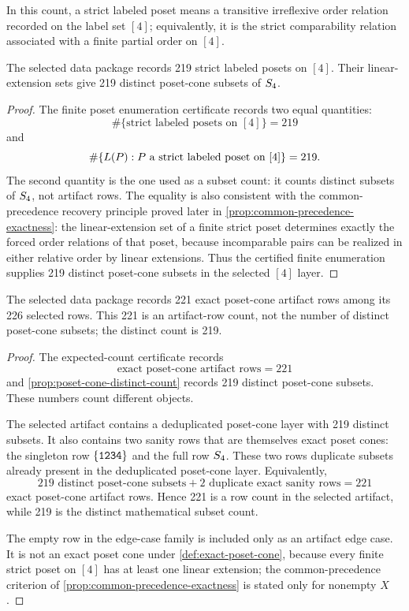 In this count, a strict labeled poset means a transitive irreflexive order relation recorded on the label set \([4]\); equivalently, it is the strict comparability relation associated with a finite partial order on \([4]\).

\begin{certproposition}
\label{prop:poset-cone-distinct-count}
The selected data package records 219 strict labeled posets on \([4]\). Their linear-extension sets give 219 distinct poset-cone subsets of \(S_4\).
\end{certproposition}

\begin{proof}
The finite poset enumeration certificate records two equal quantities:
\[
  \#\{\text{strict labeled posets on }[4]\}=219
\]
and
\[
  \#\{L(P):P\text{ a strict labeled poset on }[4]\}=219.
\]
The second quantity is the one used as a subset count: it counts distinct subsets of \(S_4\), not artifact rows. The equality is also consistent with the common-precedence recovery principle proved later in \cref{prop:common-precedence-exactness}: the linear-extension set of a finite strict poset determines exactly the forced order relations of that poset, because incomparable pairs can be realized in either relative order by linear extensions. Thus the certified finite enumeration supplies 219 distinct poset-cone subsets in the selected \([4]\) layer.
\end{proof}

\begin{certproposition}
\label{prop:exact-artifact-row-count}
The selected data package records 221 exact poset-cone artifact rows among its 226 selected rows. This 221 is an artifact-row count, not the number of distinct poset-cone subsets; the distinct count is 219.
\end{certproposition}

\begin{proof}
The expected-count certificate records
\[
  \text{exact poset-cone artifact rows}=221
\]
and \cref{prop:poset-cone-distinct-count} records 219 distinct poset-cone subsets. These numbers count different objects.

The selected artifact contains a deduplicated poset-cone layer with 219 distinct subsets. It also contains two sanity rows that are themselves exact poset cones: the singleton row \(\{\texttt{1234}\}\) and the full row \(S_4\). These two rows duplicate subsets already present in the deduplicated poset-cone layer. Equivalently,
\[
  219\text{ distinct poset-cone subsets}+2\text{ duplicate exact sanity rows}=221
\]
exact poset-cone artifact rows. Hence 221 is a row count in the selected artifact, while 219 is the distinct mathematical subset count.

The empty row in the edge-case family is included only as an artifact edge case. It is not an exact poset cone under \cref{def:exact-poset-cone}, because every finite strict poset on \([4]\) has at least one linear extension; the common-precedence criterion of \cref{prop:common-precedence-exactness} is stated only for nonempty \(X\).
\end{proof}

